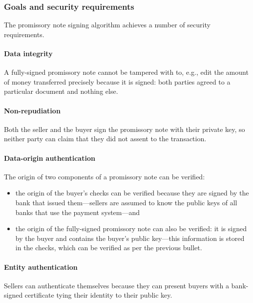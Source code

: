 \documentclass[12pt,a4paper]{article}
\begin{document}
\begin{multicols}{2}
	\subsubsection{Goals and security requirements}

	The promissory note signing algorithm achieves a number of security requirements.
	
	\paragraph{Data integrity}

	A fully-signed promissory note cannot be tampered with to, e.g., edit the amount of money transferred precisely because it is signed: both parties agreed to a particular document and nothing else.

	\paragraph{Non-repudiation}
	
	Both the seller and the buyer sign the promissory note with their private key, so neither party can claim that they did not assent to the transaction.

	\paragraph{Data-origin authentication}
	
	The origin of two components of a promissory note can be verified:
	
	\begin{itemize}
		\item the origin of the buyer's checks can be verified because they are signed by the bank that issued them---sellers are assumed to know the public keys of all banks that use the payment system---and
	
		\item the origin of the fully-signed promissory note can also be verified: it is signed by the buyer and contains the buyer's public key---this information is stored in the checks, which can be verified as per the previous bullet.
	\end{itemize}

	\paragraph{Entity authentication}

	Sellers can authenticate themselves because they can present buyers with a bank-signed certificate tying their identity to their public key.


\end{multicols}
\end{document}
